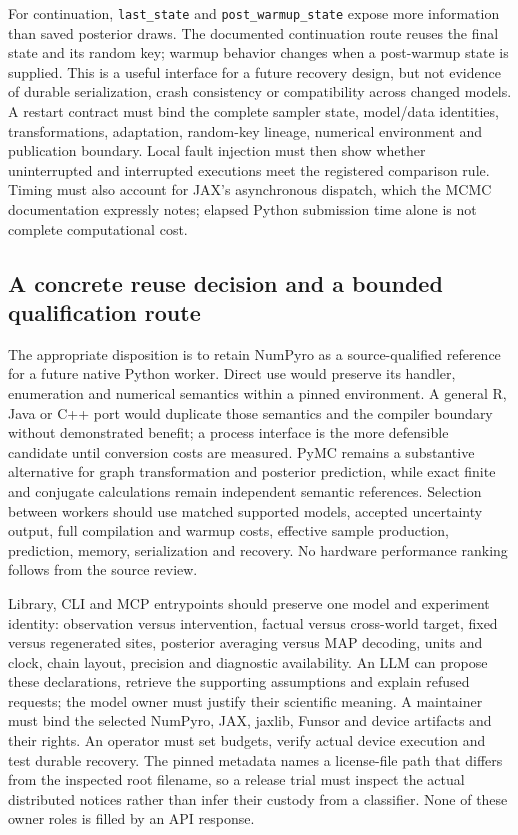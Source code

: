 For continuation, \texttt{last\_state} and \texttt{post\_warmup\_state} expose more information than saved posterior draws. The documented continuation route reuses the final state and its random key; warmup behavior changes when a post-warmup state is supplied. This is a useful interface for a future recovery design, but not evidence of durable serialization, crash consistency or compatibility across changed models. A restart contract must bind the complete sampler state, model/data identities, transformations, adaptation, random-key lineage, numerical environment and publication boundary. Local fault injection must then show whether uninterrupted and interrupted executions meet the registered comparison rule. Timing must also account for JAX's asynchronous dispatch, which the MCMC documentation expressly notes; elapsed Python submission time alone is not complete computational cost. \citep{exec23_numpyro_sources}

\subsection{A concrete reuse decision and a bounded qualification route}

The appropriate disposition is to retain NumPyro as a source-qualified reference for a future native Python worker. Direct use would preserve its handler, enumeration and numerical semantics within a pinned environment. A general R, Java or C++ port would duplicate those semantics and the compiler boundary without demonstrated benefit; a process interface is the more defensible candidate until conversion costs are measured. PyMC remains a substantive alternative for graph transformation and posterior prediction, while exact finite and conjugate calculations remain independent semantic references. Selection between workers should use matched supported models, accepted uncertainty output, full compilation and warmup costs, effective sample production, prediction, memory, serialization and recovery. No hardware performance ranking follows from the source review. \citep{exec23_numpyro_sources,exec23_pymc_sources,exec23_numpyro_reference}

Library, CLI and MCP entrypoints should preserve one model and experiment identity: observation versus intervention, factual versus cross-world target, fixed versus regenerated sites, posterior averaging versus MAP decoding, units and clock, chain layout, precision and diagnostic availability. An LLM can propose these declarations, retrieve the supporting assumptions and explain refused requests; the model owner must justify their scientific meaning. A maintainer must bind the selected NumPyro, JAX, jaxlib, Funsor and device artifacts and their rights. An operator must set budgets, verify actual device execution and test durable recovery. The pinned metadata names a license-file path that differs from the inspected root filename, so a release trial must inspect the actual distributed notices rather than infer their custody from a classifier. None of these owner roles is filled by an API response. \citep{exec23_numpyro_sources}

